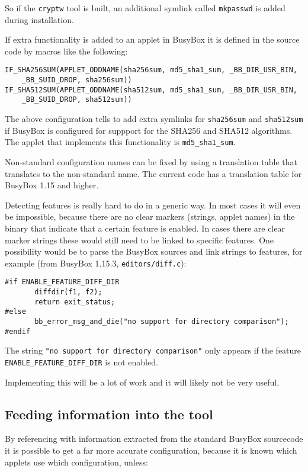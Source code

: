 \documentclass[10pt]{article}
\begin{document}
So if the \texttt{cryptw} tool is built, an additional symlink called
\texttt{mkpasswd} is added during installation.

If extra functionality is added to an applet in BusyBox it is defined in the
source code by macros like the following:

\begin{verbatim}
IF_SHA256SUM(APPLET_ODDNAME(sha256sum, md5_sha1_sum, _BB_DIR_USR_BIN,
    _BB_SUID_DROP, sha256sum))
IF_SHA512SUM(APPLET_ODDNAME(sha512sum, md5_sha1_sum, _BB_DIR_USR_BIN,
    _BB_SUID_DROP, sha512sum))
\end{verbatim}

The above configuration tells to add extra symlinks for \texttt{sha256sum} and
\texttt{sha512sum} if BusyBox is configured for suppport for the SHA256 and
SHA512 algorithms. The applet that implements this functionality is
\texttt{md5\_sha1\_sum}.

Non-standard configuration names can be fixed by using a translation table that
translates to the non-standard name. The current code has a translation table
for BusyBox 1.15 and higher.

Detecting features is really hard to do in a generic way. In most cases it will
even be impossible, because there are no clear markers (strings, applet names)
in the binary that indicate that a certain feature is enabled. In cases there
are clear marker strings these would still need to be linked to specific
features. One possibility would be to parse the BusyBox sources and link
strings to features, for example (from BusyBox 1.15.3,
\texttt{editors/diff.c}):

\begin{verbatim}
#if ENABLE_FEATURE_DIFF_DIR
       diffdir(f1, f2);
       return exit_status;
#else
       bb_error_msg_and_die("no support for directory comparison");
#endif
\end{verbatim}

The string \texttt{"no support for directory comparison"} only appears if the
feature \texttt{ENABLE\_FEATURE\_DIFF\_DIR} is not enabled.

Implementing this will be a lot of work and it will likely not be very useful.

\subsection{Feeding information into the tool}

By referencing with information extracted from the standard BusyBox sourcecode
it is possible to get a far more accurate configuration, because it is known
which applets use which configuration, unless:
\end{document}
